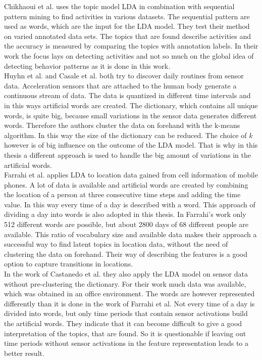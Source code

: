 Chikhaoui et al. \cite{journals/percom/ChikhaouiWP12} uses the topic model LDA in combination with sequential pattern mining to find activities in various datasets. The sequential pattern are used as words, which are the input for the LDA model.  They test their method on varied annotated data sets. The topics that are found describe activities and the accuracy is measured by comparing the topics with annotation labels. In their work the focus lays on detecting activities and not so much on the global idea of detecting behavior patterns as it is done in this work.\\

Huyhn et al. \cite{Huynh:2008:DAP:1409635.1409638} and Casale et al. \cite{Casale:2009} both try to discover daily routines from sensor data. Acceleration sensors that are attached to the human body generate a continuous stream of data. The data is quantized in different time intervals and in this ways artificial words are created. The dictionary, which contains all unique words, is quite big, because small variations in the sensor data generates different words. Therefore the authors cluster the data on forehand with the k-means algorithm. In this way the size of the dictionary can be reduced. The choice of $k$ however is of big influence on the outcome of the LDA model. That is why in this thesis a different approach is used to handle the big amount of variations in the artificial words.\\

Farrahi et al. \cite{farrahi2008daily} applies LDA to location data gained from cell information of mobile phones. A lot of data is available and artificial words are created by combining the location of a person at three consecutive time steps and adding the time value. In this way every time of a day is described with a word. This approach of dividing a day into words is also adopted in this thesis. In Farrahi's work only 512 different words are possible, but about 2800 days of 68 different people are available. This ratio of vocabulary size and available data makes their approach a successful way to find latent topics in location data, without the need of clustering the data on forehand. Their way of describing the features is a good option to capture transitions in locations.\\

In the work of Castanedo et al. \cite{EXSY:EXSY12033} they also apply the LDA model on sensor data without pre-clustering the dictionary. For their work much data was available, which was obtained in an office environment. The words are however represented differently than it is done in the work of Farrahi et al. Not every time of a day is divided into words, but only time periods that contain sensor activations build the artificial words. They indicate that it can become difficult to give a good interpretation of the topics, that are found. So it is questionable if leaving out time periods without sensor activations in the feature representation leads to a better result.\\





